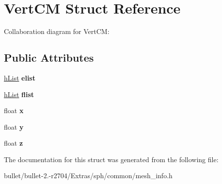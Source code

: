 \hypertarget{struct_vert_c_m}{\section{Vert\+C\+M Struct Reference}
\label{struct_vert_c_m}
}


Collaboration diagram for Vert\+C\+M\+:
\subsection*{Public Attributes}
\begin{DoxyCompactItemize}
\item 
\hypertarget{struct_vert_c_m_ad2fadbc0c65777c185958e456b770bf1}{\hyperlink{structh_list}{h\+List} {\bfseries elist}}\label{struct_vert_c_m_ad2fadbc0c65777c185958e456b770bf1}

\item 
\hypertarget{struct_vert_c_m_af44496b7bb8cf405afd9498d3dc6d34a}{\hyperlink{structh_list}{h\+List} {\bfseries flist}}\label{struct_vert_c_m_af44496b7bb8cf405afd9498d3dc6d34a}

\item 
\hypertarget{struct_vert_c_m_ae0dd2d60cbe6d36cb17cc0ce9cdd413d}{float {\bfseries x}}\label{struct_vert_c_m_ae0dd2d60cbe6d36cb17cc0ce9cdd413d}

\item 
\hypertarget{struct_vert_c_m_a5cb85e1fa356bfe51bf349093bed6740}{float {\bfseries y}}\label{struct_vert_c_m_a5cb85e1fa356bfe51bf349093bed6740}

\item 
\hypertarget{struct_vert_c_m_ab1a13951a1e7c069123970b923fe6950}{float {\bfseries z}}\label{struct_vert_c_m_ab1a13951a1e7c069123970b923fe6950}

\end{DoxyCompactItemize}


The documentation for this struct was generated from the following file\+:\begin{DoxyCompactItemize}
\item 
bullet/bullet-\/2.-\/r2704/\+Extras/sph/common/mesh\+\_\+info.\+h\end{DoxyCompactItemize}
